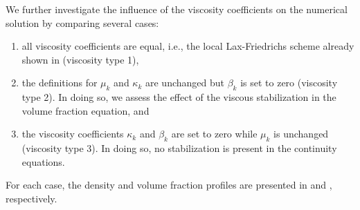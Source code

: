 We further investigate the influence of the viscosity coefficients on the numerical solution by comparing several cases:
%
\begin{enumerate}
\item all viscosity coefficients are equal, i.e., the local Lax-Friedrichs scheme already shown in  (viscosity type 1), 
\item the definitions for $\mu_k$ and $\kappa_k$ are unchanged but $\beta_k$ is set to zero (viscosity type 2). In doing so, we assess the effect 
of the viscous stabilization in the volume fraction equation, and 
\item the viscosity coefficients $\kappa_k$ and $\beta_k$ are set to zero while $\mu_k$ is unchanged (viscosity type 3). In doing so, no stabilization is present in the continuity equations. 
\end{enumerate}
%
For each case, the density and volume fraction profiles are presented in  and , respectively.
%
